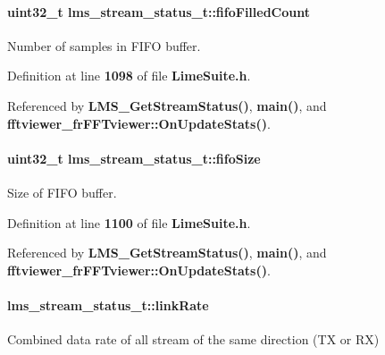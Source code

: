 \paragraph[{fifo\+Filled\+Count}]{\setlength{\rightskip}{0pt plus 5cm}uint32\+\_\+t lms\+\_\+stream\+\_\+status\+\_\+t\+::fifo\+Filled\+Count}\label{structlms__stream__status__t_a2274f194fc8cd8bd25798c8f9bc66cf9}


Number of samples in F\+I\+FO buffer. 



Definition at line {\bf 1098} of file {\bf Lime\+Suite.\+h}.



Referenced by {\bf L\+M\+S\+\_\+\+Get\+Stream\+Status()}, {\bf main()}, and {\bf fftviewer\+\_\+fr\+F\+F\+Tviewer\+::\+On\+Update\+Stats()}.

\paragraph[{fifo\+Size}]{\setlength{\rightskip}{0pt plus 5cm}uint32\+\_\+t lms\+\_\+stream\+\_\+status\+\_\+t\+::fifo\+Size}\label{structlms__stream__status__t_a627d844a6109861317a79ea398bb14c6}


Size of F\+I\+FO buffer. 



Definition at line {\bf 1100} of file {\bf Lime\+Suite.\+h}.



Referenced by {\bf L\+M\+S\+\_\+\+Get\+Stream\+Status()}, {\bf main()}, and {\bf fftviewer\+\_\+fr\+F\+F\+Tviewer\+::\+On\+Update\+Stats()}.

\paragraph[{link\+Rate}]{ lms\+\_\+stream\+\_\+status\+\_\+t\+::link\+Rate}\label{structlms__stream__status__t_adb51f3b1f1b589fbf949295ffeae62e6}


Combined data rate of all stream of the same direction (TX or RX) 



